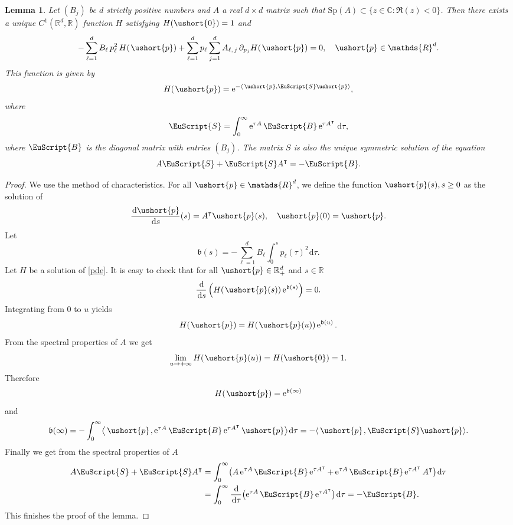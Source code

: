 \documentclass[JEP,XML,SOM,Unicode]{cedram}
\numberwithin{equation}{section}
\theoremstyle{plain}
\newtheorem{lemma}[theorem]{Lemma}
\theoremstyle{definition}
\newcommand{\real}{\mathbb{R}}
\newcommand{\rpd}{\mathbb{R}_+^d}
\newcommand{\Sp}{\mathrm{Sp}}
\newcommand{\vp}{\ushort{p}}
\newcommand{\e}{\operatorname{e}}
\newcommand{\dd}{\hspace{1pt}\mathrm{d}}
\begin{document}
\begin{lemma}\label{uniquesol}
Let $(B_{j})$ be $d$ strictly positive numbers and $A$ a real $d\times
d$ matrix
such that $\Sp(A)\subset\{z\in\mathds{C}: \Re(z)<0\}$. Then
there exists a unique $C^{1}(\mathds{R}^d,\mathds{R})$ function $H$ satisfying
$H(\ushort{0})=1$ and
\begin{equation}
\label{pde}
-\sum_{\ell=1}^{d}B_{\ell}\, p_{\ell}^2\,H(\hspace{1pt}\vp)+\sum_{\ell=1}^{d} p_{\ell}\sum_{j=1}^{d}A_{\ell,\,j}\,\partial_{p_{j}}H(\hspace{1pt}\vp)=0,\quad \vp\in \mathds{R}^d.
\end{equation}
This function is given by
\[
H(\hspace{1pt}\vp)=\e^{-\langle\, \vp,\EuScript{S}\vp \rangle},
\]
where
\[
\EuScript{S}=\int_{0}^{\infty}\e^{\tau A}\EuScript{B}\e^{\tau A^{\intercal}}\dd\tau,
\]
where $\EuScript{B}$ is the diagonal matrix with entries $(B_{j})$.
The matrix $S$ is also the unique symmetric solution of the
equation
\[
A \EuScript{S}+\EuScript{S} A^{\intercal}=-\EuScript{B}.
\]
\end{lemma}
\begin{proof} We use the method of characteristics. For all $\vp\in \mathds{R}^d$, we define the function
$\vp(s), s\geq 0$ as the solution of
\[
\frac{\dd\vp}{\dd s}(s)= A^{\intercal}\vp(s),\quad\vp(0)=\vp.
\]
Let
\[
\mathfrak{b}(s)=-\sum_{\ell=1}^d B_{\ell} \int_{0}^{s} p_{\ell}(\tau)^2\dd\tau.
\]
Let $H$ be a solution of \eqref{pde}. It is easy to check that for all $\vp\in\rpd$ and $s\in\real$
\[
\frac{\dd}{\dd s}\left(H\!\left(\hspace{1pt}\vp(s)\right)\e^{\mathfrak{b}(s)}\right)=0.
\]
Integrating from $0$ to $u$ yields
\[
H(\hspace{1pt}\vp)=H\!\left(\hspace{1pt}\vp(u)\right) \e^{\mathfrak{b}(u)}.
\]
From the spectral properties of $A$ we get
\[
\lim_{u\to+\infty}H\!\left(\hspace{1pt}\vp(u)\right) =H(\ushort{0})=1.
\]
Therefore
\[
H(\hspace{1pt}\vp)=\e^{\mathfrak{b}(\infty)}
\]
and
\[
\mathfrak{b}(\infty)=-\int_{0}^{\infty}\bigl\langle\,\vp\hspace{1pt},\e^{\tau A}\EuScript{B}\e^{\tau A^{\intercal}}\vp\bigr\rangle\dd\tau
=-\langle\, \vp\hspace{1pt},\EuScript{S}\vp\rangle.
\]
Finally we get from the spectral properties of $A$
\begin{align*}
A \EuScript{S}+\EuScript{S} A^{\intercal}
&= \int_{0}^{\infty} \bigl(A\e^{\tau A}\EuScript{B}\e^{\tau A^{\intercal}}+\e^{\tau A}\EuScript{B}\e^{\tau A^{\intercal}} A^{\intercal} \bigr)
\dd\tau\\
&= \int_{0}^{\infty}\frac{\dd}{\dd\tau} \bigl(\e^{\tau A}\EuScript{B}\e^{\tau A^{\intercal}} \bigr)\dd\tau
=-\EuScript{B}.
\end{align*}
This finishes the proof of the lemma.
\end{proof}

\backmatter


\end{document}
